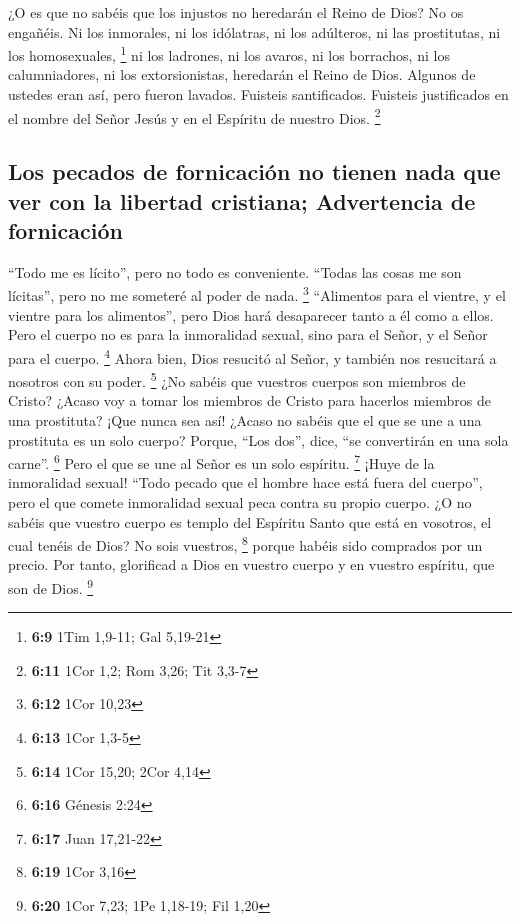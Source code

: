  ¿O es que no sabéis que los injustos no heredarán el
Reino de Dios? No os engañéis. Ni los inmorales, ni los idólatras, ni
los adúlteros, ni las prostitutas, ni los homosexuales, \footnote{\textbf{6:9}
  1Tim 1,9-11; Gal 5,19-21}  ni los ladrones, ni los
avaros, ni los borrachos, ni los calumniadores, ni los extorsionistas,
heredarán el Reino de Dios.  Algunos de ustedes eran así,
pero fueron lavados. Fuisteis santificados. Fuisteis justificados en el
nombre del Señor Jesús y en el Espíritu de nuestro Dios. \footnote{\textbf{6:11}
  1Cor 1,2; Rom 3,26; Tit 3,3-7}

\hypertarget{los-pecados-de-fornicaciuxf3n-no-tienen-nada-que-ver-con-la-libertad-cristiana-advertencia-de-fornicaciuxf3n}{%
\subsection{Los pecados de fornicación no tienen nada que ver con la
libertad cristiana; Advertencia de
fornicación}\label{los-pecados-de-fornicaciuxf3n-no-tienen-nada-que-ver-con-la-libertad-cristiana-advertencia-de-fornicaciuxf3n}}

 ``Todo me es lícito'', pero no todo es conveniente.
``Todas las cosas me son lícitas'', pero no me someteré al poder de
nada. \footnote{\textbf{6:12} 1Cor 10,23}  ``Alimentos
para el vientre, y el vientre para los alimentos'', pero Dios hará
desaparecer tanto a él como a ellos. Pero el cuerpo no es para la
inmoralidad sexual, sino para el Señor, y el Señor para el cuerpo.
\footnote{\textbf{6:13} 1Cor 1,3-5}  Ahora bien, Dios
resucitó al Señor, y también nos resucitará a nosotros con su poder.
\footnote{\textbf{6:14} 1Cor 15,20; 2Cor 4,14}  ¿No
sabéis que vuestros cuerpos son miembros de Cristo? ¿Acaso voy a tomar
los miembros de Cristo para hacerlos miembros de una prostituta? ¡Que
nunca sea así!  ¿Acaso no sabéis que el que se une a una
prostituta es un solo cuerpo? Porque, ``Los dos'', dice, ``se
convertirán en una sola carne''. \footnote{\textbf{6:16} Génesis 2:24}
 Pero el que se une al Señor es un solo espíritu.
\footnote{\textbf{6:17} Juan 17,21-22}  ¡Huye de la
inmoralidad sexual! ``Todo pecado que el hombre hace está fuera del
cuerpo'', pero el que comete inmoralidad sexual peca contra su propio
cuerpo.  ¿O no sabéis que vuestro cuerpo es templo del
Espíritu Santo que está en vosotros, el cual tenéis de Dios? No sois
vuestros, \footnote{\textbf{6:19} 1Cor 3,16}  porque
habéis sido comprados por un precio. Por tanto, glorificad a Dios en
vuestro cuerpo y en vuestro espíritu, que son de Dios. \footnote{\textbf{6:20}
  1Cor 7,23; 1Pe 1,18-19; Fil 1,20}

